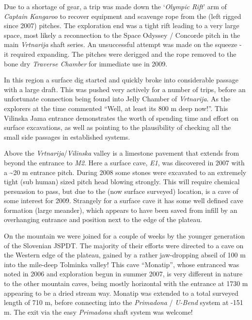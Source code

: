 Due to a shortage of gear, a trip was made down the `\emph{Olympic
Rift}' arm of \emph{Captain Kangaroo} to recover equipment and scavenge
rope from the (left rigged since 2007) pitches. The exploration end was
a tight rift leading to a very large space, most likely a reconnection
to the Space Odyssey / Concorde pitch in the main \emph{Vrtnarija} shaft
series. An unsuccessful attempt was made on the squeeze - it required
expanding. The pitches were derigged and the rope removed to the bone
dry \emph{Traverse Chamber} for immediate use in 2009.

In this region a surface dig started and quickly broke into considerable
passage with a large draft. This was pushed very actively for a number
of trips, before an unfortunate connection being found into Jelly
Chamber of \emph{Vrtnarija}. As the explorers at the time commented
``Well, at least its 800 m deep now!''. This Vilinska Jama entrance
demonstrates the worth of spending time and effort on surface
excavations, as well as pointing to the plausibility of checking all the
small side passages in established systems.

Above the \emph{Vrtnarija}/\emph{Vilinska} valley is a limestone
pavement that extends from beyond the entrance to \emph{M2}. Here a
surface cave, \emph{E1}, was discovered in 2007 with a
\textasciitilde{}20 m entrance pitch. During 2008 some stones were
excavated to an extremely tight (sub human) sized pitch head blowing
strongly. This will require chemical persuasion to pass, but due to the
(now surface surveyed) location, is a cave of some interest for 2009.
Strangely for a surface cave it has some well defined cave formation
(large meander), which appears to have been saved from infill by an
overhanging entrance and position next to the edge of the plateau.

On the mountain we were joined for a couple of weeks by the younger
generation of the Slovenian JSPDT. The majority of their efforts were
directed to a cave on the Western edge of the plateau, gained by a
rather jaw-dropping abseil of 100 m into the mile-deep Tolminka valley!
This cave ``Monatip'', whose entranced was noted in 2006 and exploration
begun in summer 2007, is very different in nature to the other mountain
caves, being mostly horizontal with the entrance at 1730 m appearing to
be a dried stream way. Monatip was extended to a total surveyed length
of 710 m, before connecting into the \emph{Primadona} / \emph{U-Bend}
system at -151 m. The exit via the easy \emph{Primadona} shaft system
was welcome!

